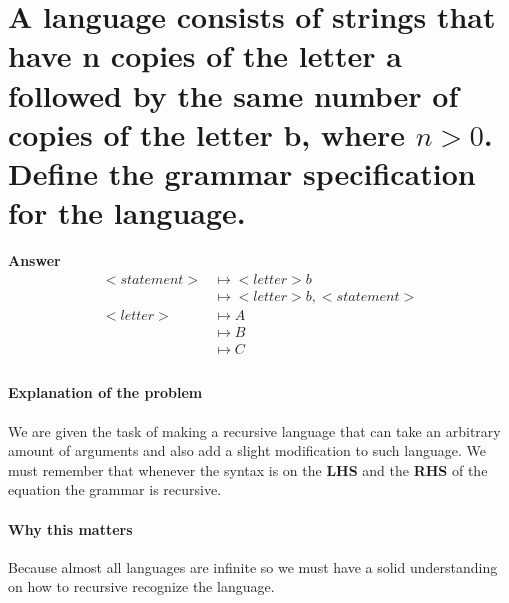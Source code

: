 \section{A language consists of strings that have n copies of the letter a followed by
the same number of copies of the letter b, where \(n > 0\). Define the grammar
specification for the language.}
\textbf{Answer}
 \begin{align*}
<statement> &\mapsto <letter>b \\
&\mapsto <letter>b, <statement> \\
<letter> &\mapsto A \\
&\mapsto B \\
&\mapsto C \\
\end{align*}

\paragraph{Explanation of the problem} We are given the task of making a recursive language that can take an arbitrary amount of arguments and also add a slight modification to such language. We must remember that whenever the syntax is on the \textbf{LHS} and the \textbf{RHS} of the equation the grammar is recursive. 
\paragraph{Why this matters} Because almost all languages are infinite so we must have a solid understanding on how to recursive recognize the language. 
